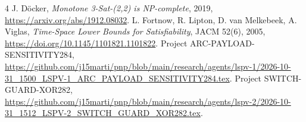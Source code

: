 \documentclass[11pt]{article}
\begin{document}
\begin{thebibliography}{4}
 J. D\"ocker, \emph{Monotone 3-Sat-(2,2) is NP-complete}, 2019, \url{https://arxiv.org/abs/1912.08032}.
 L. Fortnow, R. Lipton, D. van Melkebeek, A. Viglas, \emph{Time-Space Lower Bounds for Satisfiability}, JACM 52(6), 2005, \url{https://doi.org/10.1145/1101821.1101822}.
 Project ARC-PAYLOAD-SENSITIVITY284, \url{https://github.com/j15marti/pnp/blob/main/research/agents/lspv-1/2026-10-31_1500_LSPV-1_ARC_PAYLOAD_SENSITIVITY284.tex}.
 Project SWITCH-GUARD-XOR282, \url{https://github.com/j15marti/pnp/blob/main/research/agents/lspv-2/2026-10-31_1512_LSPV-2_SWITCH_GUARD_XOR282.tex}.
\end{thebibliography}
\end{document}
